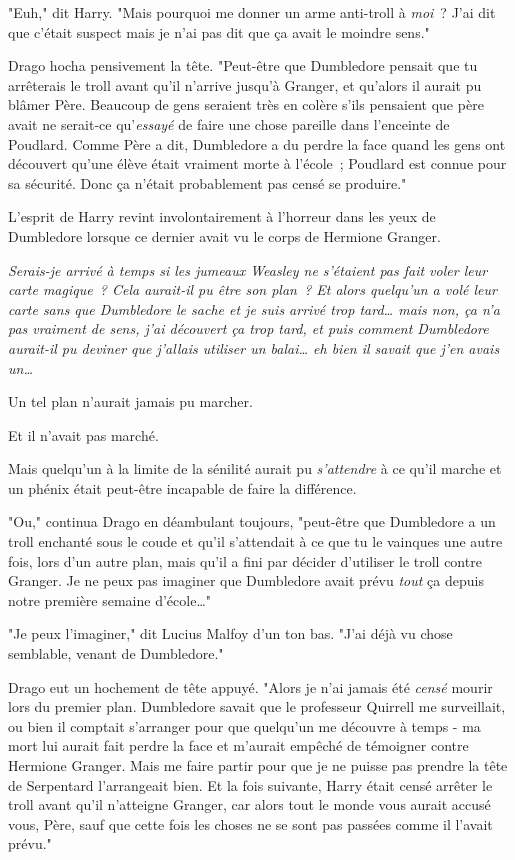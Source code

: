 "Euh," dit Harry. "Mais pourquoi me donner un arme anti-troll à \emph{moi}~? J'ai dit que c'était suspect mais je n'ai pas dit que ça avait le moindre sens."

Drago hocha pensivement la tête. "Peut-être que Dumbledore pensait que tu arrêterais le troll avant qu'il n'arrive jusqu'à Granger, et qu'alors il aurait pu blâmer Père. Beaucoup de gens seraient très en colère s'ils pensaient que père avait ne serait-ce qu'\emph{essayé} de faire une chose pareille dans l'enceinte de Poudlard. Comme Père a dit, Dumbledore a du perdre la face quand les gens ont découvert qu'une élève était vraiment morte à l'école~; Poudlard est connue pour sa sécurité. Donc ça n'était probablement pas censé se produire."

L'esprit de Harry revint involontairement à l'horreur dans les yeux de Dumbledore lorsque ce dernier avait vu le corps de Hermione Granger.

\emph{Serais-je arrivé à temps si les jumeaux Weasley ne s'étaient pas fait voler leur carte magique~? Cela aurait-il pu être son plan~? Et alors quelqu'un a volé leur carte sans que Dumbledore le sache et je suis arrivé trop tard… mais non, ça n'a pas vraiment de sens, j'ai découvert ça trop tard, et puis comment Dumbledore aurait-il pu deviner que j'allais utiliser un balai… eh bien il savait que j'en avais un…}

Un tel plan n'aurait jamais pu marcher.

Et il n'avait pas marché.

Mais quelqu'un à la limite de la sénilité aurait pu \emph{s'attendre} à ce qu'il marche et un phénix était peut-être incapable de faire la différence.

"Ou," continua Drago en déambulant toujours, "peut-être que Dumbledore a un troll enchanté sous le coude et qu'il s'attendait à ce que tu le vainques une autre fois, lors d'un autre plan, mais qu'il a fini par décider d'utiliser le troll contre Granger. Je ne peux pas imaginer que Dumbledore avait prévu \emph{tout} ça depuis notre première semaine d'école…"

"Je peux l'imaginer," dit Lucius Malfoy d'un ton bas. "J'ai déjà vu chose semblable, venant de Dumbledore."

Drago eut un hochement de tête appuyé. "Alors je n'ai jamais été \emph{censé} mourir lors du premier plan. Dumbledore savait que le professeur Quirrell me surveillait, ou bien il comptait s'arranger pour que quelqu'un me découvre à temps - ma mort lui aurait fait perdre la face et m'aurait empêché de témoigner contre Hermione Granger. Mais me faire partir pour que je ne puisse pas prendre la tête de Serpentard l'arrangeait bien. Et la fois suivante, Harry était censé arrêter le troll avant qu'il n'atteigne Granger, car alors tout le monde vous aurait accusé vous, Père, sauf que cette fois les choses ne se sont pas passées comme il l'avait prévu."

